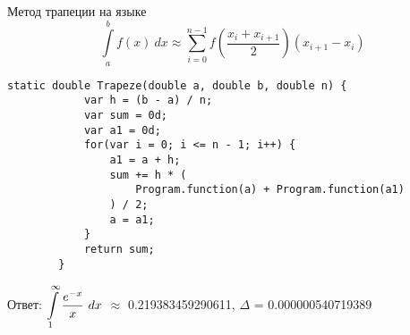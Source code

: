 \def \itemtitle {Метод трапеции на языке \textit \Csh}

\item
	\itemtitle
	\[ \displaystyle \int \limits_{a}^{b} {f(x) ~ dx} \approx \sum\limits_{i=0}^{n-1}
	f\left(\dfrac{x_{i} + x_{i+1}}{2}\right)(x_{i+1} - {x}_{i})  \]
	\begin{lstlisting}[caption=\itemtitle]
		static double Trapeze(double a, double b, double n) {
			var h = (b - a) / n;
			var sum = 0d;
			var a1 = 0d;
			for(var i = 0; i <= n - 1; i++) {
				a1 = a + h;
				sum += h * (
					Program.function(a) + Program.function(a1)
				) / 2;
				a = a1;
			}
			return sum;
		}
	\end{lstlisting}
	Ответ: $\displaystyle \int\limits_1^{\infty} {\frac{ e^{-x} }{ x } ~ dx}$ $\approx$ 0.219383459290611, $\Delta$ = 0.000000540719389
